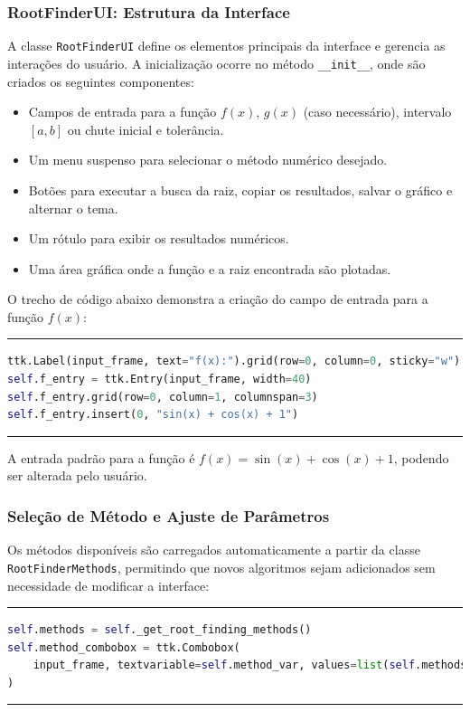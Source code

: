 \subsubsection{RootFinderUI: Estrutura da Interface}

A classe \texttt{RootFinderUI} define os elementos principais da interface e
gerencia as interações do usuário. A inicialização ocorre no método
\texttt{\_\_init\_\_}, onde são criados os seguintes componentes:
\begin{itemize}
	\item Campos de entrada para a função \( f(x) \), \( g(x) \) (caso
	      necessário), intervalo \([a, b]\) ou chute inicial e tolerância.
	\item Um menu suspenso para selecionar o método numérico desejado.
	\item Botões para executar a busca da raiz, copiar os resultados, salvar o
	      gráfico e alternar o tema.
	\item Um rótulo para exibir os resultados numéricos.
	\item Uma área gráfica onde a função e a raiz encontrada são plotadas.
\end{itemize}

O trecho de código abaixo demonstra a criação do campo de entrada para a função
\( f(x) \):

\hrule
\lstset{style=mystyle}
\begin{lstlisting}[language=Python]
ttk.Label(input_frame, text="f(x):").grid(row=0, column=0, sticky="w")
self.f_entry = ttk.Entry(input_frame, width=40)
self.f_entry.grid(row=0, column=1, columnspan=3)
self.f_entry.insert(0, "sin(x) + cos(x) + 1")
\end{lstlisting}
\hrule

A entrada padrão para a função é \( f(x) = \sin(x) + \cos(x) + 1 \), podendo ser
alterada pelo usuário.

\subsubsection{Seleção de Método e Ajuste de Parâmetros}

Os métodos disponíveis são carregados automaticamente a partir da classe
\texttt{RootFinderMethods}, permitindo que novos algoritmos sejam adicionados
sem necessidade de modificar a interface:

\hrule
\lstset{style=mystyle}
\begin{lstlisting}[language=Python]
self.methods = self._get_root_finding_methods()
self.method_combobox = ttk.Combobox(
    input_frame, textvariable=self.method_var, values=list(self.methods.keys())
)
\end{lstlisting}
\hrule

